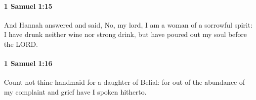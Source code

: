 		\paragraph{1 Samuel 1:15} %
			\label{1SAMUEL-1-15}

			And Hannah answered and said, No, my lord, I am a woman of a sorrowful spirit: I have drunk neither wine nor strong drink, but have poured out my soul before the LORD.


		\paragraph{1 Samuel 1:16} %
			\label{1SAMUEL-1-16}

			Count not thine handmaid for a daughter of Belial: for out of the abundance of my complaint and grief have I spoken hitherto.


